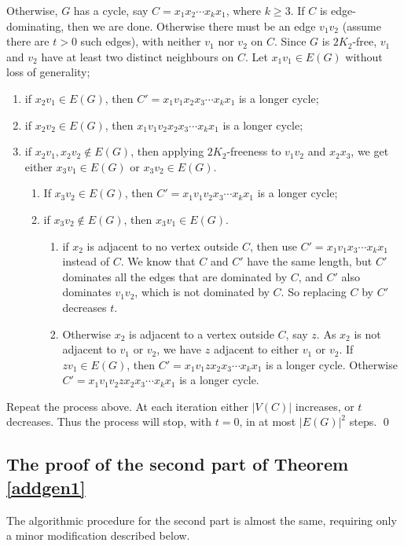\documentclass[runningheads,a4paper]{llncs}
\begin{document}
Otherwise, $G$ has a cycle, say $C=x_1x_2\cdots x_kx_1$, where $k\ge3$.
If $C$ is edge-dominating, then we are done. 
Otherwise
there must be an edge $v_1v_2$ (assume there are $t>0$ such edges), 
with neither $v_1$ nor $v_2$ on $C$. 
Since $G$ is $2K_2$-free, $v_1$ and $v_2$ have at least two distinct neighbours on $C$. 
Let $x_1v_1\in E(G)$ without loss of generality; 
\begin{enumerate}
\item if $x_2v_1\in E(G)$, then $C'=x_1v_1x_2x_3\cdots x_kx_1$ is a longer cycle;
\item if $x_2v_2\in E(G)$, then $x_1v_1v_2x_2x_3\cdots x_kx_1$ is a longer cycle; 
\item if $x_2v_1,x_2v_2\not\in E(G)$, then applying $2K_2$-freeness to $v_1v_2$ and $x_2x_3$, 
we get either $x_3v_1\in E(G)$ or $x_3v_2\in E(G)$.
\begin{enumerate}
\item If $x_3v_2\in E(G)$, then $C'=x_1v_1v_2x_3\cdots x_kx_1$ is a longer cycle;
\item if $x_3v_2\not\in E(G)$, then $x_3v_1\in E(G)$.
\begin{enumerate}
\item if $x_2$ is adjacent to no vertex outside $C$, then use $C'=x_1v_1x_3\cdots x_kx_1$ instead of $C$. 
We know that $C$ and $C'$ have the same length, but $C'$ dominates all the edges that
are dominated by $C$, and $C'$ also dominates $v_1v_2$, which is not dominated by $C$. So replacing $C$ by $C'$
decreases $t$.
\item Otherwise $x_2$ is adjacent to a vertex outside $C$, say $z$.
As $x_2$ is not adjacent to $v_1$ or $v_2$, we have $z$ adjacent to either $v_1$ or $v_2$. If $zv_1\in E(G)$, then $C'=x_1v_1zx_2x_3\cdots x_kx_1$ is a longer cycle.
Otherwise $C'=x_1v_1v_2zx_2x_3\cdots x_kx_1$ is a longer cycle.
\end{enumerate}
\end{enumerate}
\end{enumerate}
Repeat the process above. At each iteration either $|V(C)|$ increases, or $t$ decreases.
Thus the process will stop, with $t=0$, in at most $|E(G)|^2$ steps. 
\qed

\subsection{The proof of the second part of Theorem  \ref{addgen1}}
The algorithmic procedure for the second part is almost the same, requiring only a minor
modification described below.
\end{document}
